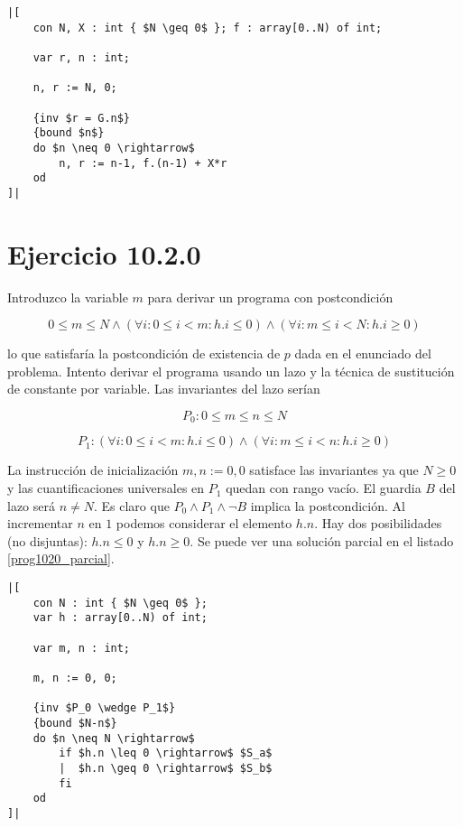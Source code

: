 \documentclass{article}
\begin{document}
\begin{lstlisting}[float,caption={Solución del ejercicio 4.4.2},label=prog442]
|[
    con N, X : int { $N \geq 0$ }; f : array[0..N) of int;

    var r, n : int;

    n, r := N, 0;

    {inv $r = G.n$}
    {bound $n$}
    do $n \neq 0 \rightarrow$
        n, r := n-1, f.(n-1) + X*r
    od
]|
\end{lstlisting}

\section{Ejercicio 10.2.0}

Introduzco la variable $m$ para derivar un programa con postcondición

$$
0 \leq m \leq N \wedge (\forall i : 0 \leq i < m : h.i \leq 0) \wedge (\forall i : m \leq i < N : h.i \geq 0)
$$

lo que satisfaría la postcondición de existencia de $p$ dada en el enunciado
del problema. Intento derivar el programa usando un lazo y la técnica de
sustitución de constante por variable. Las invariantes del lazo serían

$$
P_0: 0 \leq m \leq n \leq N
$$

$$
P_1: (\forall i : 0 \leq i < m : h.i \leq 0) \wedge (\forall i : m \leq i < n : h.i \geq 0)
$$

La instrucción de inicialización $m, n := 0, 0$ satisface las invariantes ya que $N \geq 0$ y
las cuantificaciones universales en $P_1$ quedan con rango vacío. El guardia $B$ del lazo será
$n \neq N$. Es claro que $P_0 \wedge P_1 \wedge \neg B$ implica la postcondición.
Al incrementar $n$ en $1$ podemos considerar el elemento $h.n$. Hay dos
posibilidades (no disjuntas): $h.n \leq 0$ y $h.n \geq 0$. Se puede ver una solución parcial en
el listado \ref{prog1020_parcial}.

\begin{lstlisting}[float,caption={Solución parcial del ejercicio 10.2.0},label=prog1020_parcial]
|[
    con N : int { $N \geq 0$ };
    var h : array[0..N) of int;

    var m, n : int;

    m, n := 0, 0;

    {inv $P_0 \wedge P_1$}
    {bound $N-n$}
    do $n \neq N \rightarrow$
        if $h.n \leq 0 \rightarrow$ $S_a$
        |  $h.n \geq 0 \rightarrow$ $S_b$
        fi
    od
]|
\end{lstlisting}
\end{document}
